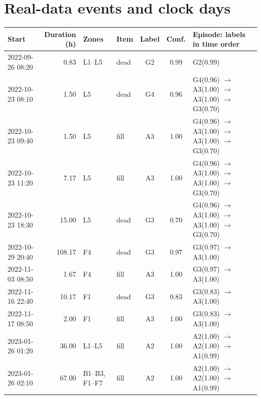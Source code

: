 \documentclass[11pt,a4paper]{article}
\makeatletter
\newenvironment{stable}{\par\addvspace{8pt}\noindent\begin{minipage}{\textwidth}\def\@captype{table}\centering}{\end{minipage}\par\addvspace{8pt}}
\makeatother
\begin{document}
\clearpage\section{Real-data events and clock days}\label{sec:s-real}
\begin{stable}
\caption{Key events on the real data. Each row is a rule item with its final label and confidence; rows between two horizontal lines form one episode, whose items' labels are listed in time order with their confidence. Times as recorded. The January 2023 episode is shown in Fig.~4 of the article, the episode of 31 March -- 2 April 2024 in Fig.~5 and the episode of 16 July 2023 in Fig.~\ref{fig:s-jul2023}.}\label{tab:s-key-events}
\scriptsize\setlength{\tabcolsep}{3.5pt}
\begin{tabular}{@{}l r l l c c >{\raggedright\arraybackslash}p{4.3cm}@{}}
\toprule
Start & Duration (h) & Zones & Item & Label & Conf. & Episode: labels in time order \\
\midrule
2022-09-26 08:20 & 0.83 & L1--L5 & dead & G2 & 0.99 & G2(0.99) \\
\midrule
2022-10-23 08:10 & 1.50 & L5 & dead & G4 & 0.96 & G4(0.96) $\rightarrow$ A3(1.00) $\rightarrow$ A3(1.00) $\rightarrow$ G3(0.70) \\
2022-10-23 09:40 & 1.50 & L5 & fill & A3 & 1.00 & G4(0.96) $\rightarrow$ A3(1.00) $\rightarrow$ A3(1.00) $\rightarrow$ G3(0.70) \\
2022-10-23 11:20 & 7.17 & L5 & fill & A3 & 1.00 & G4(0.96) $\rightarrow$ A3(1.00) $\rightarrow$ A3(1.00) $\rightarrow$ G3(0.70) \\
2022-10-23 18:30 & 15.00 & L5 & dead & G3 & 0.70 & G4(0.96) $\rightarrow$ A3(1.00) $\rightarrow$ A3(1.00) $\rightarrow$ G3(0.70) \\
\midrule
2022-10-29 20:40 & 108.17 & F4 & dead & G3 & 0.97 & G3(0.97) $\rightarrow$ A3(1.00) \\
2022-11-03 08:50 & 1.67 & F4 & fill & A3 & 1.00 & G3(0.97) $\rightarrow$ A3(1.00) \\
\midrule
2022-11-16 22:40 & 10.17 & F1 & dead & G3 & 0.83 & G3(0.83) $\rightarrow$ A3(1.00) \\
2022-11-17 08:50 & 2.00 & F1 & fill & A3 & 1.00 & G3(0.83) $\rightarrow$ A3(1.00) \\
\midrule
2023-01-26 01:20 & 36.00 & L1--L5 & fill & A2 & 1.00 & A2(1.00) $\rightarrow$ A2(1.00) $\rightarrow$ A1(0.99) \\
2023-01-26 02:10 & 67.00 & B1--B3, F1--F7 & fill & A2 & 1.00 & A2(1.00) $\rightarrow$ A2(1.00) $\rightarrow$ A1(0.99) \\

\end{tabular}
\end{stable}
\end{document}
